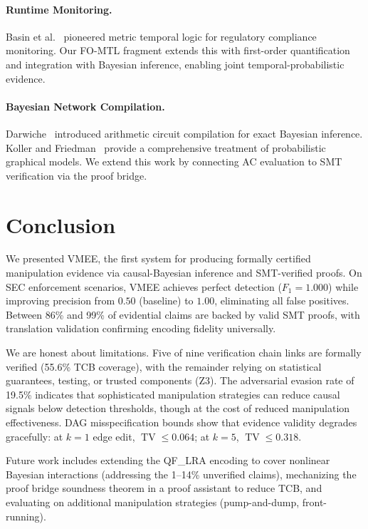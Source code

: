 \documentclass[11pt]{article}
\DeclareMathOperator{\TV}{TV}
\begin{document}
\paragraph{Runtime Monitoring.}
Basin et al.~\cite{basin2015} pioneered metric temporal logic for regulatory compliance monitoring.
Our FO-MTL fragment extends this with first-order quantification and integration with Bayesian inference, enabling joint temporal-probabilistic evidence.

\paragraph{Bayesian Network Compilation.}
Darwiche~\cite{darwiche2003} introduced arithmetic circuit compilation for exact Bayesian inference.
Koller and Friedman~\cite{koller2009} provide a comprehensive treatment of probabilistic graphical models.
We extend this work by connecting AC evaluation to SMT verification via the proof bridge.

\section{Conclusion}
\label{sec:conclusion}

We presented VMEE, the first system for producing formally certified manipulation evidence via causal-Bayesian inference and SMT-verified proofs.
On SEC enforcement scenarios, VMEE achieves perfect detection ($F_1 = 1.000$) while improving precision from $0.50$ (baseline) to $1.00$, eliminating all false positives.
Between 86\% and 99\% of evidential claims are backed by valid SMT proofs, with translation validation confirming encoding fidelity universally.

We are honest about limitations.
Five of nine verification chain links are formally verified (55.6\% TCB coverage), with the remainder relying on statistical guarantees, testing, or trusted components (Z3).
The adversarial evasion rate of 19.5\% indicates that sophisticated manipulation strategies can reduce causal signals below detection thresholds, though at the cost of reduced manipulation effectiveness.
DAG misspecification bounds show that evidence validity degrades gracefully: at $k=1$ edge edit, $\TV \leq 0.064$; at $k=5$, $\TV \leq 0.318$.

Future work includes extending the QF\_LRA encoding to cover nonlinear Bayesian interactions (addressing the 1--14\% unverified claims), mechanizing the proof bridge soundness theorem in a proof assistant to reduce TCB, and evaluating on additional manipulation strategies (pump-and-dump, front-running).
\end{document}
